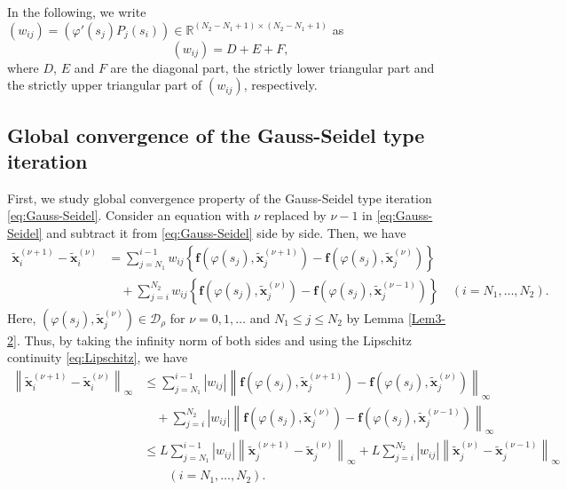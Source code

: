 \documentclass[pdflatex,sn-mathphys-num]{sn-jnl}%
\theoremstyle{thmstyleone}%
\theoremstyle{thmstyletwo}%
\theoremstyle{thmstylethree}%
\begin{document}
In the following, we write $(w_{ij})=(\varphi'(s_j)P_j(s_i))\in\mathbb{R}^{(N_2-N_1+1)\times(N_2-N_1+1)}$ as
\begin{equation}
(w_{ij})=D+E+F,
\label{eq:DEFdefinition}
\end{equation}
where $D$, $E$ and $F$ are the diagonal part, the strictly lower triangular part and the strictly upper triangular part of $(w_{ij})$, respectively.



\subsection{Global convergence of the Gauss-Seidel type iteration}
First, we study global convergence property of the Gauss-Seidel type iteration \eqref{eq:Gauss-Seidel}. Consider an equation with $\nu$ replaced by $\nu-1$ in \eqref{eq:Gauss-Seidel} and subtract it from \eqref{eq:Gauss-Seidel} side by side. Then, we have
\begin{align}
\widetilde{\bm x}_i^{(\nu+1)}-\widetilde{\bm x}_i^{(\nu)} &= \sum_{j=N_1}^{i-1} w_{ij}\left\{{\bm f}(\varphi(s_j),\widetilde{\bm x}_j^{(\nu+1)})-{\bm f}(\varphi(s_j),\widetilde{\bm x}_j^{(\nu)})\right\} \nonumber \\
& \quad + \sum_{j=i}^{N_2} w_{ij}\left\{{\bm f}(\varphi(s_j),\widetilde{\bm x}_j^{(\nu)})-{\bm f}(\varphi(s_j),\widetilde{\bm x}_j^{(\nu-1)})\right\} \quad (i=N_1,\ldots,N_2).
\end{align}
Here, $(\varphi(s_j),\widetilde{\bm x}_j^{(\nu)})\in\mathcal{D}_{\rho}$ for $\nu=0,1,\ldots$ and $N_1\le j\le N_2$ by Lemma \ref{Lem3-2}. Thus, by taking the infinity norm of both sides and using the Lipschitz continuity \eqref{eq:Lipschitz}, we have
\begin{align}
\left\|\widetilde{\bm x}_i^{(\nu+1)}-\widetilde{\bm x}_i^{(\nu)}\right\|_{\infty} &\le \sum_{j=N_1}^{i-1} |w_{ij}|\left\|{\bm f}(\varphi(s_j),\widetilde{\bm x}_j^{(\nu+1)})-{\bm f}(\varphi(s_j),\widetilde{\bm x}_j^{(\nu)})\right\|_{\infty} \nonumber \\
& \quad + \sum_{j=i}^{N_2} |w_{ij}|\left\|{\bm f}(\varphi(s_j),\widetilde{\bm x}_j^{(\nu)})-{\bm f}(\varphi(s_j),\widetilde{\bm x}_j^{(\nu-1)})\right\|_{\infty} \nonumber \\
&\le L\sum_{j=N_1}^{i-1} |w_{ij}|\left\|\widetilde{\bm x}_j^{(\nu+1)}-\widetilde{\bm x}_j^{(\nu)}\right\|_{\infty} + L\sum_{j=i}^{N_2} |w_{ij}|\left\|\widetilde{\bm x}_j^{(\nu)}-\widetilde{\bm x}_j^{(\nu-1)}\right\|_{\infty} \nonumber \\
& \quad\quad (i=N_1,\ldots,N_2).
\label{eq:xinudiff}
\end{align}
\end{document}
